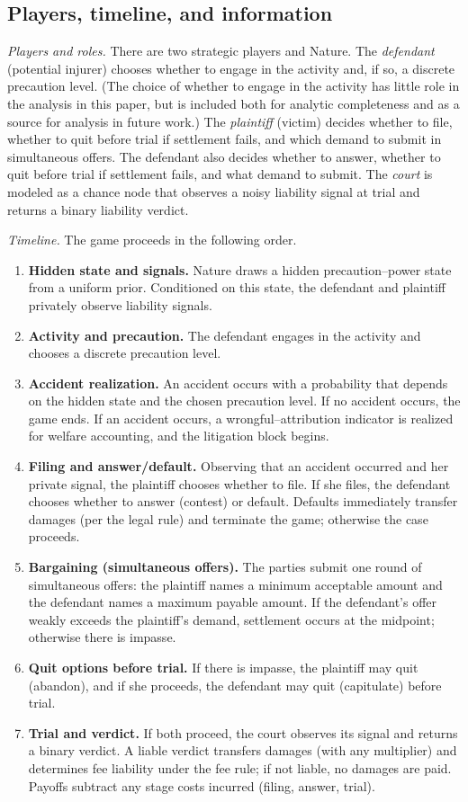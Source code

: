 \documentclass{article}
\begin{document}
\subsection{Players, timeline, and information}
\emph{Players and roles.} There are two strategic players and Nature. The \emph{defendant} (potential injurer) chooses whether to engage in the activity and, if so, a discrete precaution level. (The choice of whether to engage in the activity has little role in the analysis in this paper, but is included both for analytic completeness and as a source for analysis in future work.) The \emph{plaintiff} (victim) decides whether to file, whether to quit before trial if settlement fails, and which demand to submit in simultaneous offers. The defendant also decides whether to answer, whether to quit before trial if settlement fails, and what demand to submit. The \emph{court} is modeled as a chance node that observes a noisy liability signal at trial and returns a binary liability verdict.

\emph{Timeline.} The game proceeds in the following order.
\begin{enumerate}
\item \textbf{Hidden state and signals.} Nature draws a hidden precaution--power state from a uniform prior. Conditioned on this state, the defendant and plaintiff privately observe liability signals.
\item \textbf{Activity and precaution.} The defendant engages in the activity and chooses a discrete precaution level.
\item \textbf{Accident realization.} An accident occurs with a probability that depends on the hidden state and the chosen precaution level. If no accident occurs, the game ends. If an accident occurs, a wrongful--attribution indicator is realized for welfare accounting, and the litigation block begins.
\item \textbf{Filing and answer/default.} Observing that an accident occurred and her private signal, the plaintiff chooses whether to file. If she files, the defendant chooses whether to answer (contest) or default. Defaults immediately transfer damages (per the legal rule) and terminate the game; otherwise the case proceeds.
\item \textbf{Bargaining (simultaneous offers).} The parties submit one round of simultaneous offers: the plaintiff names a minimum acceptable amount and the defendant names a maximum payable amount. If the defendant’s offer weakly exceeds the plaintiff’s demand, settlement occurs at the midpoint; otherwise there is impasse.
\item \textbf{Quit options before trial.} If there is impasse, the plaintiff may quit (abandon), and if she proceeds, the defendant may quit (capitulate) before trial.
\item \textbf{Trial and verdict.} If both proceed, the court observes its signal and returns a binary verdict. A liable verdict transfers damages (with any multiplier) and determines fee liability under the fee rule; if not liable, no damages are paid. Payoffs subtract any stage costs incurred (filing, answer, trial).
\end{enumerate}
\end{document}
